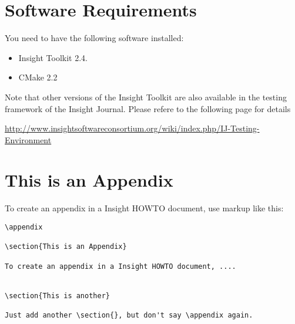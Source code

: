 \documentclass{InsightArticle}
\begin{document}



\section{Software Requirements}

You need to have the following software installed:

\begin{itemize}
  \item  Insight Toolkit 2.4.
  \item  CMake 2.2
\end{itemize}

Note that other versions of the Insight Toolkit are also available in the
testing framework of the Insight Journal. Please refere to the following page
for details

\url{http://www.insightsoftwareconsortium.org/wiki/index.php/IJ-Testing-Environment}





\appendix

\section{This is an Appendix}

To create an appendix in a Insight HOWTO document, use markup like
this:

\begin{verbatim}
\appendix

\section{This is an Appendix}

To create an appendix in a Insight HOWTO document, ....


\section{This is another}

Just add another \section{}, but don't say \appendix again.
\end{verbatim}


%
%



\end{document}
